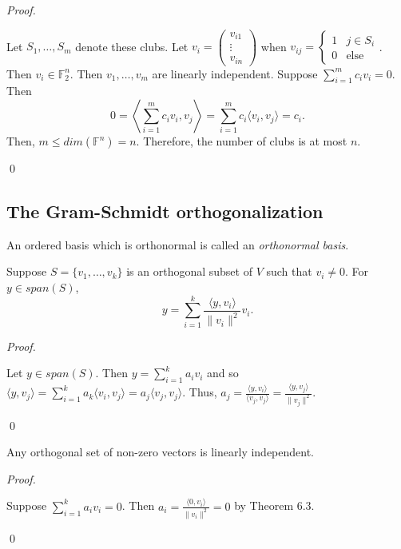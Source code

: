 \documentclass[12pt]{article}
\newenvironment{theorem}[2][Theorem]{\begin{trivlist}
\item[\hskip \labelsep {\bfseries #1}\hskip \labelsep {\bfseries #2.}]}{\end{trivlist}}
\newenvironment{corollary}[2][Corollary]{\begin{trivlist}
\item[\hskip \labelsep {\bfseries #1}\hskip \labelsep {\bfseries #2}]}{\end{trivlist}}
\newenvironment{definition}[2][Definition]{\begin{trivlist}
\item[\hskip \labelsep {\bfseries #1}\hskip \labelsep {\bfseries #2}]}{\end{trivlist}}
\newenvironment{sol}
    {\emph{Proof.}
    }
    {
    \qed
    }
\begin{document}
\begin{sol}
Let $S_1, \dots, S_m$ denote these clubs. Let $v_i = \begin{pmatrix}
v_{i1} \\ \vdots \\ v_{in}
\end{pmatrix}$ when $v_{ij} = 
        \begin{cases} 
            1 & j \in S_i \\
            0 & \text{else}
        \end{cases}$. Then $v_i \in \mathbb{F}_2^n$. Then $v_1, \dots, v_m$ are linearly independent. Suppose $\sum_{i = 1}^m c_iv_i = 0$. Then $$0 = \left\langle \sum_{i = 1}^mc_iv_i, v_j \right\rangle = \sum_{i = 1}^m c_i \langle v_i, v_j \rangle = c_i.$$ Then, $m \leq dim(\mathbb{F}^n) = n$. Therefore, the number of clubs is at most $n$.
\end{sol}

\subsection{The Gram-Schmidt orthogonalization}

\begin{definition}{5}
An ordered basis which is orthonormal is called an \textit{orthonormal basis}.
\end{definition}

\begin{theorem}{6.3}
Suppose $S = \{v_1, \dots, v_k\}$ is an orthogonal subset of $V$ such that $v_i \neq 0$. For $y \in span(S)$, $$y = \sum_{i = 1}^k\frac{\langle y, v_i \rangle}{\lVert v_i \rVert^2}v_i.$$
\end{theorem}

\begin{sol}
Let $y \in span(S)$. Then $y = \sum_{i = 1}^k a_iv_i$ and so $\langle y, v_j \rangle = \sum_{i = 1}^k a_k \langle v_i, v_j \rangle = a_j \langle v_j, v_j \rangle$. Thus, $a_j = \frac{\langle y, v_i \rangle}{\langle v_j, v_j \rangle} = \frac{\langle y, v_j \rangle}{\lVert v_j \rVert^2}$.
\end{sol}

\begin{corollary}{4}
Any orthogonal set of non-zero vectors is linearly independent.
\end{corollary}

\begin{sol}
Suppose $\sum_{i = 1}^ka_iv_i = 0$. Then $a_i = \frac{\langle 0, v_i \rangle}{\lVert v_i \rVert^2} = 0$ by Theorem 6.3.
\end{sol}
\end{document}
